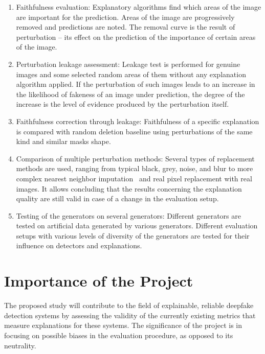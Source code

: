 \documentclass[12pt,a4wide]{report}
\theoremstyle{plain}
\theoremstyle{definition}
\theoremstyle{remark}
\begin{document}
\begin{enumerate}
  \item Faithfulness evaluation:
Explanatory algorithms find which areas of the image are important for the prediction. Areas of the image are progressively removed and predictions are noted. The removal curve is the result of perturbation – its effect on the prediction of the importance of certain areas of the image.

  \item Perturbation leakage assessment:
Leakage test is performed for genuine images and some selected random areas of them without any explanation algorithm applied. If the perturbation of such images leads to an increase in the likelihood of fakeness of an image under prediction, the degree of the increase is the level of evidence produced by the perturbation itself.

  \item Faithfulness correction through leakage:
Faithfulness of a specific explanation is compared with random deletion baseline using perturbations of the same kind and similar masks shape.

  \item Comparison of multiple perturbation methods:
Several types of replacement methods are used, ranging from typical black, grey, noise, and blur to more complex nearest neighbor imputation~\cite{rong2022road} and real pixel replacement with real images. It allows concluding that the results concerning the explanation quality are still valid in case of a change in the evaluation setup.

  \item Testing of the generators on several generators:
Different generators are tested on artificial data generated by various generators. Different evaluation setups with various levels of diversity of the generators are tested for their influence on detectors and explanations.

\end{enumerate}



\section{Importance of the Project}
\label{sec:contributions}

The proposed study will contribute to the field of explainable, reliable deepfake detection systems by assessing the validity of the currently existing metrics that measure explanations for these systems. The significance of the project is in focusing on possible biases in the evaluation procedure, as opposed to its neutrality.
\end{document}
